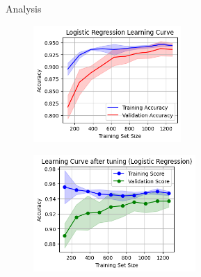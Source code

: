 \documentclass[14pt, aspectratio=169]{beamer}
\begin{document}
\begin{frame}[allowframebreaks]{Analysis}
\begin{adjustwidth}{-0.75cm}{1.25cm} %

  \begin{figure}[H]
    \centering
    \begin{minipage}{0.45\textwidth}
        \centering
        \includegraphics[height=12em]{../report/lc_LR.png}
        \label{lc_LR}
    \end{minipage}
    \hfill
    \begin{minipage}{0.45\textwidth}
        \centering
        \includegraphics[height=12em]{../report/lc_tuned_LR.png}
        \label{lc_tuned_LR}
    \end{minipage}
  \end{figure}
  

\end{adjustwidth}
\end{frame}
\end{document}
